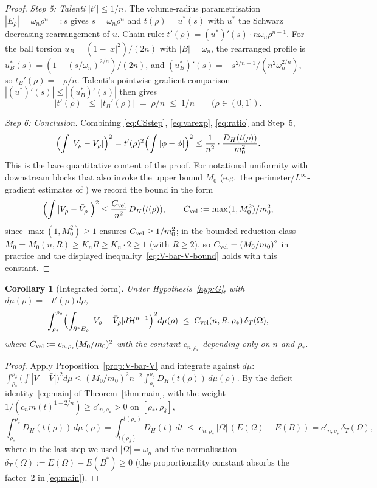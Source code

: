 \documentclass[11pt]{article}
\newtheorem{corollary}[theorem]{Corollary}
\theoremstyle{definition}
\newcommand{\Om}{\Omega}
\newcommand{\rstar}{\rho_{*}}
\begin{document}
\begin{proof}
\emph{Step 5: Talenti $|t'|\le 1/n$.}
The volume-radius parametrisation $|E_{\rho}|=\omega_{n}\rho^{n}=:s$
gives $s=\omega_{n}\rho^{n}$ and $t(\rho)=u^{*}(s)$ with $u^{*}$ the
Schwarz decreasing rearrangement of $u$.  Chain rule:
$t'(\rho)=(u^{*})'(s)\cdot n\omega_{n}\rho^{n-1}$.  For the ball
torsion $u_{B}=(1-|x|^{2})/(2n)$ with $|B|=\omega_{n}$, the rearranged
profile is $u_{B}^{*}(s)=(1-(s/\omega_{n})^{2/n})/(2n)$, and
$(u_{B}^{*})'(s)=-s^{2/n-1}/(n^{2}\omega_{n}^{2/n})$, so
$t_{B}'(\rho)=-\rho/n$.  Talenti's pointwise gradient comparison
$|(u^{*})'(s)|\le|(u_{B}^{*})'(s)|$ \cite[Thm.~1]{Talenti1976} then
gives
\[
   |t'(\rho)|\;\le\;|t_{B}'(\rho)|\;=\;\rho/n\;\le\;1/n
   \qquad(\rho\in(0,1]).
\]

\emph{Step 6: Conclusion.}  Combining
\eqref{eq:CSstep}, \eqref{eq:varexp}, \eqref{eq:ratio} and Step~5,
\[
   \Bigl(\int|V_{\rho}-\bar V_{\rho}|\Bigr)^{2}
   =t'(\rho)^{2}\Bigl(\int|\phi-\bar\phi|\Bigr)^{2}
   \le \frac{1}{n^{2}}\cdot\frac{D_{H}(t(\rho))}{m_{0}^{2}}.
\]
This is the bare quantitative content of the proof.  For
notational uniformity with downstream blocks that also invoke the
upper bound $M_{0}$ (e.g.\ the perimeter/$L^{\infty}$-gradient
estimates of \cite{WeightedMetricTrace}) we record the bound in
the form
\[
   \Bigl(\int|V_{\rho}-\bar V_{\rho}|\Bigr)^{2}
   \le\frac{C_{\rm vel}}{n^{2}}\,D_{H}(t(\rho)),
   \qquad
   C_{\rm vel}:=\max(1,M_{0}^{2})/m_{0}^{2},
\]
since $\max(1,M_{0}^{2})\ge 1$ ensures $C_{\rm vel}\ge 1/m_{0}^{2}$;
in the bounded reduction class
$M_{0}=M_{0}(n,R)\ge K_{n}R\ge K_{n}\cdot 2\ge 1$ (with $R\ge 2$),
so $C_{\rm vel}=(M_{0}/m_{0})^{2}$ in practice and the displayed
inequality~\eqref{eq:V-bar-V-bound} holds with this constant.
\end{proof}

\begin{corollary}[Integrated form]\label{cor:int-V-bar-V}
Under Hypothesis~\ref{hyp:G}, with $d\mu(\rho)=-t'(\rho)d\rho$,
\[
   \int_{\rstar}^{\rho_{\delta}}\Bigl(\int_{\partial^{*}E_{\rho}}
     |V_{\rho}-\bar V_{\rho}|d\mathcal H^{n-1}\Bigr)^{2}d\mu(\rho)
   \;\le\;C_{\rm vel}(n,R,\rstar)\,\delta_{T}(\Om),
\]
where $C_{\rm vel}:=c_{n,\rstar}(M_{0}/m_{0})^{2}$ with the constant
$c_{n,\rstar}$ depending only on $n$ and $\rstar$.
\end{corollary}

\begin{proof}
Apply Proposition~\ref{prop:V-bar-V} and integrate against $d\mu$:
$\int_{\rstar}^{\rho_{\delta}}\bigl(\int|V-\bar V|\bigr)^{2}d\mu
\le(M_{0}/m_{0})^{2}n^{-2}\int_{\rstar}^{\rho_{\delta}}D_{H}(t(\rho))\,d\mu(\rho)$.
By the deficit identity~\eqref{eq:main} of Theorem~\ref{thm:main}, with
the weight $1/(c_{n}m(t)^{1-2/n})\ge c'_{n,\rstar}>0$ on
$[\rstar,\rho_{\delta}]$,
\[
   \int_{\rstar}^{\rho_{\delta}}D_{H}(t(\rho))\,d\mu(\rho)
   =\int_{t(\rho_{\delta})}^{t(\rstar)}D_{H}(t)\,dt
   \;\le\;c_{n,\rstar}\,|\Om|\,(E(\Om)-E(B))
   =c'_{n,\rstar}\,\delta_{T}(\Om),
\]
where in the last step we used $|\Om|=\omega_{n}$ and the
normalisation $\delta_{T}(\Om):=E(\Om)-E(B^{*})\ge 0$
(the proportionality constant absorbs the factor~$2$ in
\eqref{eq:main}).
\end{proof}
\end{document}
